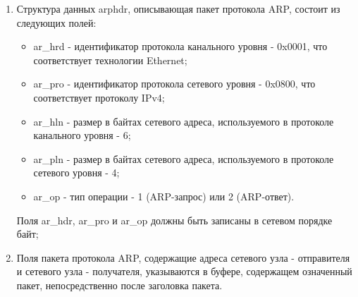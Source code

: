 \begin{enumerate}
{\begin{center}
\begin{lstlisting}
#include <string.h>
#include <sys/ioctl.h>
#include <net/if.h>

int get_iface_id(int sock, const char* device_name)
{
	struct ifreq req;
	strcpy(req.ifr_name, device_name);

	if(ioctl(sock, SIOCGIFINDEX, & req))
		return -1;
	
	return req.ifr_ifindex;
}

				\end{lstlisting}

				{\noindent Листинг~\thefigure~---~Функция get\_iface\_id(), определяющая идентификатор целевого сетевого интерфейса}

			\end{center}
		}

		\item Структура данных arphdr, описывающая пакет протокола ARP, состоит из следующих полей:

			\begin{itemize}
					
				\item ar\_hrd - идентификатор протокола канального уровня - 0x0001, что соответствует технологии Ethernet;
				\item ar\_pro - идентификатор протокола сетевого уровня - 0x0800, что соответствует протоколу IPv4;
				\item ar\_hln - размер в байтах сетевого адреса, используемого в протоколе канального уровня - 6;
				\item ar\_pln - размер в байтах сетевого адреса, используемого в протоколе сетевого уровня - 4;
				\item ar\_op - тип операции - 1 (ARP-запрос) или 2 (ARP-ответ).

			\end{itemize}

			Поля ar\_hdr, ar\_pro и ar\_op должны быть записаны в сетевом порядке байт;

		\item Поля пакета протокола ARP, содержащие адреса сетевого узла - отправителя и сетевого узла - получателя, указываются в буфере, содержащем
		означенный пакет, непосредственно после заголовка пакета.

	\end{enumerate}

